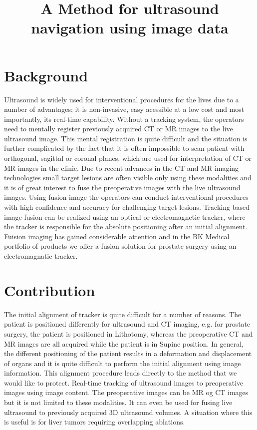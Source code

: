 \documentclass{article}[a4]
\title{\Large A Method for ultrasound navigation using image data}
\begin{document}
\maketitle


\section{Background}
Ultrasound is widely used for interventional procedures for the lives
due to a number of advantages; it is non-invasive, easy acessible at a
low cost and most importantly, its real-time capability. Without a
tracking system, the operators need to mentally register previously
acquired CT or MR images to the live ultrasound image. This mental
registration is quite difficult and the situation is further
complicated by the fact that it is often impossible to scan patient
with orthogonal, sagittal or coronal planes, which are used for
interpretation of CT or MR images in the clinic. Due to recent
advances in the CT and MR imaging technologies small target lesions
are often visible only using these modalities and it is of great
interest to fuse the preoperative images with the live ultrasound
images. Using fusion image the operators can conduct interventional
procedures with high confidence and accuracy for challenging target
lesions. Tracking-based image fusion can be realized using an optical or
electromagnetic tracker, where the tracker is responsible for the
absolute positioning after an initial alignment. Fuision imaging has
gained considerable attention and in the BK Medical portfolio of
products we offer a fusion solution for prostate surgery using an
electromagnatic tracker.

\section{Contribution}
The initial alignment of tracker is quite difficult for a number of
reasons. The patient is positioned differently for ultrasound and CT
imaging, e.g. for prostate surgery, the patient is positioned in
Lithotomy, whereas the preoperative CT and MR images are all acquired
while the patient is in Supine position. In general, the different
positioning of the patient results in a deformation and displacement
of organs and it is quite difficult to perform the initial alignment
using image information. This alignment procedure leads directly to
the method that we would like to protect. Real-time tracking of
ultrasound images to preoperative images using image content. The
preoperative images can be MR og CT images but it is not limited to
these modalities. It can even be used for fusing live ultrasound to
previously acquired 3D ultrasound volumes. A situation where this is
useful is for liver tumors requiring overlapping ablations.
\end{document}
